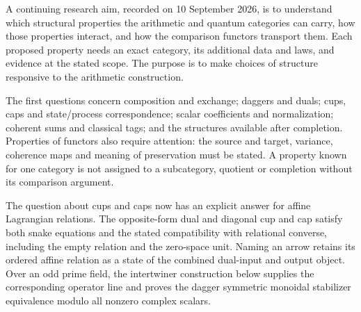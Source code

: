 A continuing research aim, recorded on 10 September 2026, is to understand
which structural properties the arithmetic and quantum categories can
carry, how those properties interact, and how the comparison functors
transport them. Each proposed property needs an exact category, its
additional data and laws, and evidence at the stated scope. The purpose
is to make choices of structure responsive to the arithmetic construction.

The first questions concern composition and exchange; daggers and duals;
cups, caps and state/process correspondence; scalar coefficients and
normalization; coherent sums and classical tags; and the structures
available after completion. Properties of functors also require attention:
the source and target, variance, coherence maps and meaning of preservation
must be stated. A property known for one category is not assigned to a
subcategory, quotient or completion without its comparison argument.

The question about cups and caps now has an explicit answer for affine
Lagrangian relations. The opposite-form dual and diagonal cup and cap
satisfy both snake equations and the stated compatibility with relational
converse, including the empty relation and the zero-space unit. Naming an
arrow retains its ordered affine relation as a state of the combined
dual-input and output object. Over an odd prime field, the intertwiner
construction below supplies the corresponding operator line and proves
the dagger symmetric monoidal stabilizer equivalence modulo all nonzero
complex scalars.

